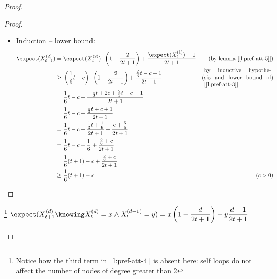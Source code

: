 \begin{proof}
\begin{proof}
\begin{itemize}
            \item Induction -- lower bound:
                \begin{align*}
                    \expect(X_{t + 1}^{(2)}) =&\ \expect(X_t^{(2)}) \cdot \left( 1 - \frac{2}{2t + 1} \right) + \frac{\expect(X_t^{(1)}) + 1}{2t + 1} & \text{(by lemma [\ref{l:pref-att-5}])} \\
                    \geq&\ \left( \frac{1}{6} t - c \right) \cdot \left( 1 - \frac{2}{2t + 1} \right) + \frac{\frac{2}{3}t - c + 1}{2t + 1} &
                    \text{(\parbox{\textwidth/3}{by inductive hypothesis and lower bound of [\ref{l:pref-att-3}]})} \\
                       =&\ \frac{1}{6} t - c + \frac{-\frac{1}{3} t + 2c + \frac{2}{3} t - c + 1}{2t + 1}                                   & \\
                       =&\ \frac{1}{6} t - c + \frac{ \frac{1}{3} t + c + 1}{2t + 1}                                                        & \\
                       =&\ \frac{1}{6} t - c + \frac{ \frac{1}{3} t + \frac{1}{6}}{2t + 1} + \frac{c + \frac{5}{6}}{2t + 1}                 & \\
                       =&\ \frac{1}{6} t - c + \frac{1}{6} + \frac{ \frac{5}{6} + c}{2t + 1}                                                & \\
                       =&\ \frac{1}{6} (t + 1) - c + \frac{ \frac{5}{6} + c}{2t + 1}                                                        & \\
                    \geq&\ \frac{1}{6} (t + 1) - c                                                                                          & (c > 0)
                \end{align*}

        \end{itemize}
    \end{proof}

    \vbox{}
    

    \vbox{}

    \begin{lemma}\label{l:pref-att-7}\footnote{Notice how the third term in [\ref{l:pref-att-4}] is absent here: self loops do not affect the number of nodes of degree greater than 2}
        $\displaystyle \expect(X_{t + 1}^{(d)} \knowing X_t^{(d)} = x \wedge X_t^{(d - 1)} = y) = x \left( 1 - \frac{d}{2t + 1} \right) + y \frac{d - 1}{2t + 1}$
    \end{lemma}


\end{proof}
